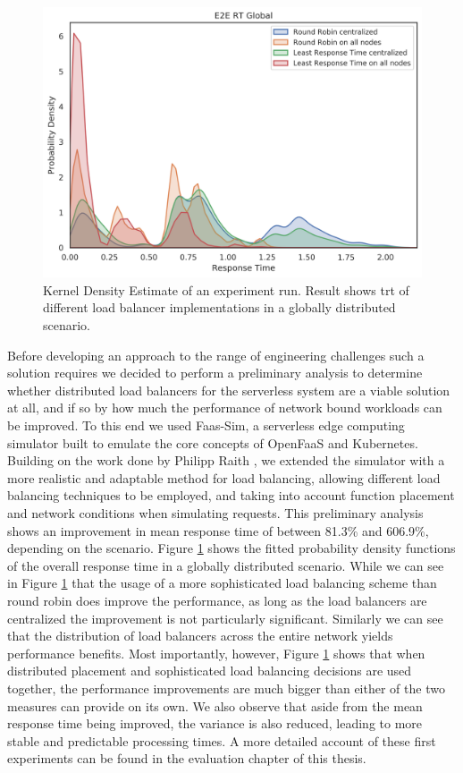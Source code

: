 \begin{figure}
    \centering
    \includegraphics[width=\linewidth]{graphics/graphs/initial_global_trt.png}
    \caption{Kernel Density Estimate of an experiment run. Result shows \gls{trt} of different load balancer implementations in a globally distributed scenario.}
    \label{fig:initial_global_trt}
\end{figure}

Before developing an approach to the range of engineering challenges such a solution requires we decided to perform a preliminary analysis to determine whether distributed load balancers for the serverless system are a viable solution at all, and if so by how much the performance of network bound workloads can be improved.
To this end we used Faas-Sim\cite{faas-sim-github},
a serverless edge computing simulator built to emulate the core concepts of OpenFaaS and Kubernetes. Building on the work done by Philipp Raith \cite{philipp-da},
we extended the simulator with a more realistic and adaptable method for load balancing, allowing different load balancing techniques to be employed, and taking into account function placement and network conditions when simulating requests.%
This preliminary analysis shows an improvement in mean response time of between 81.3\% and 606.9\%, depending on the scenario. Figure \ref{fig:initial_global_trt}
shows the fitted probability density functions of the overall response time in a globally distributed scenario. While we can see in Figure \ref{fig:initial_global_trt} that the usage of a more sophisticated load balancing scheme than round robin does improve the performance, as long as the load balancers are centralized the improvement is not particularly significant.
Similarly we can see that the distribution of load balancers across the entire network yields performance benefits.
Most importantly, however, Figure \ref{fig:initial_global_trt} shows that when distributed placement and sophisticated load balancing decisions are used together, the performance improvements are much bigger than either of the two measures can provide on its own.
We also observe that aside from the mean response time being improved, the variance is also reduced, leading to more stable and predictable processing times.
A more detailed account of these first experiments can be found in the evaluation chapter of this thesis.

